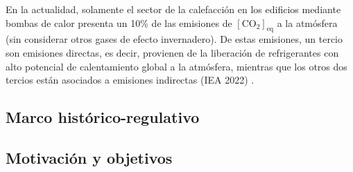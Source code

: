 \documentclass[../main.tex]{subfiles}
\begin{document}
En la actualidad, solamente el sector de la calefacción en los edificios 
mediante bombas de calor presenta un 10\% de las emisiones de 
\begin{math} \left[\text{CO}_{\text{2}}\right]_{\text{eq}} \end{math} 
a la atmósfera (sin considerar otros gases de efecto invernadero). 
De estas emisiones, un tercio son emisiones directas, es decir, 
provienen de la liberación de refrigerantes con alto potencial 
de calentamiento global a la atmósfera, mientras que los otros 
dos tercios están asociados a emisiones indirectas (IEA 2022) \cite{IEA2022FutureHeatPumps}.

\subsection{Marco histórico-regulativo}


\subsection{Motivación y objetivos}

\newpage
\end{document}
